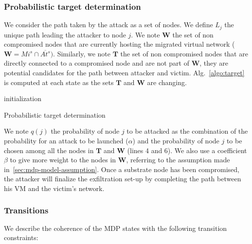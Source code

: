 \subsubsection{Probabilistic target determination}
\label{sec:target_proba}
We consider the path taken by the attack as a set of nodes.
We define $L_j$ the unique path leading the attacker to node $j$.
We note $\textbf{W}$ the set of non compromised nodes that are currently hosting the migrated virtual network (\ie $\textbf{W} = Mi^s \cap \overline{At^s})$.
Similarly, we note $\textbf{T}$ the set of non compromised nodes that are directly connected to a compromised node and are not part of $\textbf{W}$, \ie they are potential candidates for the path between attacker and victim. Alg.~\ref{algo:target} is computed at each state as the sets $\textbf{T}$ and $\textbf{W}$ are changing.
\begin{algorithm}
 initialization\;
 \caption{Probabilistic target determination}
 \label{algo:target}
\end{algorithm}


We note $q(j)$ the probability of node $j$ to be attacked as the combination of the probability for an attack to be launched (\ie $\alpha$) and the probability of node $j$ to be chosen among all the nodes in $\textbf{T}$ and $\textbf{W}$ (lines 4 and 6). We also use a coefficient $\beta$ to give more weight to the nodes in $\textbf{W}$, referring to the assumption made in~\ref{sec:mdp-model-assumption}.
Once a substrate node has been compromised, the attacker will finalize the exfiltration set-up by completing the path between his VM and the victim's network.


\subsubsection{Transitions}
We describe the coherence of the MDP states with the following transition constraints:

